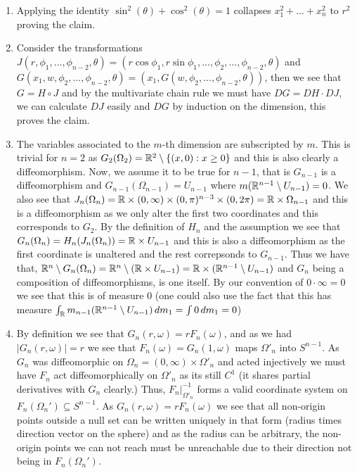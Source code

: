 \documentclass[12pt,a4paper]{article}
\begin{document}
\begin{solution}
\begin{enumerate}[label=(\alph*)]
	\item Applying the identity $\sin^2(\theta)+\cos^2(\theta)=1$ collapses $x_1^2+\ldots+x_n^2$ to $r^2$ proving the claim.
	\item Consider the transformations  $J(r,\phi_1,\ldots,\phi_{n-2},\theta)=(r\cos\phi_1,r\sin\phi_1,\ldots,\phi_2,\ldots,\phi_{n-2},\theta)$ and $G(x_1,w,\phi_2,\ldots,\phi_{n-2},\theta)=(x_1,G(w,\phi_2,\ldots,\phi_{n-2},\theta))$, then we see that $G=H\circ J$ and by the multivariate chain rule we must have $DG=DH\cdot DJ$, we can calculate $DJ$ easily and $DG$ by induction on the dimension, this proves the claim.
	\item The variables associated to the $m$-th dimension are subscripted by $m$. 
		This is trivial for $n=2$ as $G_2(\Omega_2)=\mathbb{R}^2\setminus\{(x,0):x\geq 0\}$ and this is also clearly a diffeomorphism. 
		Now, we assume it to be true for $n-1$, that is $G_{n-1}$ is a diffeomorphism and $G_{n-1}(\Omega_{n-1})=U_{n-1}$ where $m(\mathbb{R}^{n-1}\setminus U_{n-1})=0$. 
		We also see that $J_n(\Omega_n)=\mathbb{R}\times(0,\infty)\times(0,\pi)^{n-3}\times(0,2\pi)=\mathbb{R}\times\Omega_{n-1}$ and this is a diffeomorphism as we only alter the first two coordinates and this corresponds to $G_2$. 
		By the definition of $H_n$ and the assumption we see that $G_n(\Omega_n)=H_n(J_n(\Omega_n))=\mathbb{R}\times U_{n-1}$ and this is also a diffeomorphism as the first coordinate is unaltered and the rest correpsonds to $G_{n-1}.$  
		Thus we have that, $\mathbb{R}^n\setminus G_n(\Omega_n)=\mathbb{R}^n\setminus(\mathbb{R}\times U_{n-1})=\mathbb{R}\times(\mathbb{R}^{n-1}\setminus U_{n-1})$ and $G_n$ being a composition of diffeomorphisms, is one itself. 
        By our convention of $0\cdot\infty=0$ we see that this is of measure $0$ (one could also use the fact that this has measure $\int_{\mathbb{R}} m_{n-1}(\mathbb{R}^{n-1}\setminus U_{n-1})\,dm_1=\int 0\,dm_1=0$)
	\item By definition we see that $G_n(r,\omega)=rF_n(\omega)$, and as we had $|G_n(r,\omega)|=r$ we see that $F_n(\omega)=G_n(1,\omega)$ maps $\Omega'_n$ into $S^{n-1}$. 
		As $G_n$ was diffeomorphic on $\Omega_n=(0,\infty)\times\Omega'_n$ and acted injectively we must have $F_n$ act diffeomorphically on $\Omega'_n$ as its still $C^1$ (it shares partial derivatives with $G_n$ clearly.) 
		Thus, $F_n|_{\Omega'_n}^{-1}$ forms a valid coordinate system on $F_n(\Omega_n')\subseteq S^{n-1}$. 
		As $G_n(r,\omega)=rF_n(\omega)$ we see that all non-origin points outside a null set can be written uniquely in that form (radius times direction vector on the sphere) and as the radius can be arbitrary, the non-origin points we can not reach must be unreachable due to their direction not being in $F_n(\Omega_n')$. 

\end{enumerate}
\end{solution}
\end{document}
